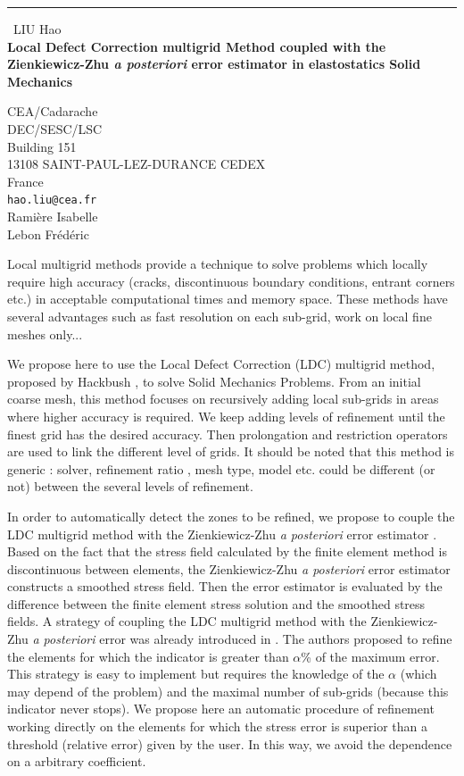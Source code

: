 \documentclass{report}
\begin{document}
\begin{center}
\rule{6in}{1pt} \
{\large LIU Hao \\
{\bf Local Defect Correction multigrid Method coupled with the Zienkiewicz-Zhu \emph{a posteriori} error estimator in elastostatics Solid Mechanics}}

CEA/Cadarache \\ DEC/SESC/LSC \\ Building 151 \\ 13108 SAINT-PAUL-LEZ-DURANCE CEDEX \\ France
\\
{\tt hao.liu@cea.fr}\\
Rami{\`e}re Isabelle\\
Lebon Fr{\'e}d{\'e}ric\end{center}

Local multigrid methods provide a technique to solve problems which
locally require high accuracy (cracks, discontinuous boundary conditions,
entrant corners etc.) in acceptable computational times and memory space.
These methods have several advantages such as fast resolution on each
sub-grid, work on local fine meshes only...

We propose here to use the Local Defect Correction (LDC) multigrid
method, proposed by Hackbush \cite{Hackbusch84}, to solve Solid Mechanics
Problems. From an initial coarse mesh, this method focuses on recursively
adding local sub-grids in areas where higher accuracy is required. We
keep adding levels of refinement until the finest grid has the desired
accuracy. Then prolongation and restriction operators are used to link
the different level of grids. It should be noted that this method is
generic : solver, refinement ratio , mesh type, model etc. could be
different (or not) between the several levels of refinement.

In order to automatically detect the zones to be refined, we propose to
couple the LDC multigrid method with the Zienkiewicz-Zhu \emph{a
posteriori} error estimator \cite{Zienkiewicz87}. Based on the fact that
the stress field calculated by the finite element method is discontinuous
between elements, the Zienkiewicz-Zhu \emph{a posteriori} error estimator
constructs a smoothed stress field. Then the error estimator is evaluated
by the difference between the finite element stress solution and the
smoothed stress fields. A strategy of coupling the LDC multigrid method
with the Zienkiewicz-Zhu \emph{a posteriori} error was already introduced
in \cite{Barbie13CAS,Barbie11}. The authors proposed to refine the
elements for which the indicator is greater than $\alpha$\% of the
maximum error. This strategy is easy to implement but requires the
knowledge of the $\alpha$ (which may depend of the problem) and the
maximal number of sub-grids (because this indicator never stops). We
propose here an automatic procedure of refinement working directly on the
elements for which the stress error is superior than a threshold
(relative error) given by the user. In this way, we avoid the dependence
on a arbitrary coefficient.
\end{document}
